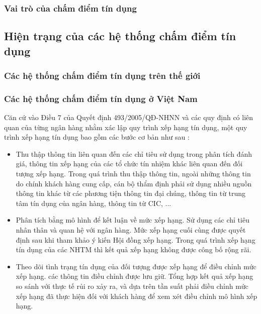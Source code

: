\subsubsection{Vai trò của chấm điểm tín dụng}

\subsection{Hiện trạng của các hệ thống chấm điểm tín dụng}
\subsubsection{Các hệ thống chấm điểm tín dụng trên thế giới}
\subsubsection{Các hệ thống chấm điểm tín dụng ở Việt Nam}
Căn cứ vào Điều 7 của Quyết định 493/2005/QĐ-NHNN và các quy định có liên quan của từng ngân hàng nhằm xác lập quy trình xếp hạng tín dụng, một quy trình 
xếp hạng tín dụng bao gồm các bước cơ bản như sau : 
\begin{itemize}
\item Thu thập thông tin liên quan đến các chỉ tiêu sử dụng trong phân tích đánh giá, thông tin xếp hạng của các tổ chức tín nhiệm khác liên quan đến đối tượng xếp hạng. Trong quá trình thu thập thông tin, ngoài những thông tin do chính khách hàng cung cấp, cán bộ thẩm định phải sử dụng nhiều nguồn thông tin khác từ các phương tiện thông tin đại chúng, thông tin từ trung tâm tín dụng của ngân hàng, thông tin từ CIC, ...
\item Phân tích bằng mô hình để kết luận về mức xếp hạng. Sử dụng các chỉ tiêu nhân thân và quan hệ với ngân hàng. Mức xếp hạng cuối cùng được quyết định sau khi tham khảo ý kiến Hội đồng xếp hạng. Trong quá trình xếp hạng tín dụng của các NHTM thì kết quả xếp hạng không được công bố rộng rãi.
\item Theo dõi tình trạng tín dụng của đối tượng được xếp hạng để điều chỉnh mức xếp hạng. các thông tin điều chỉnh được lưu giữ. Tổng hợp kết quả xếp hạng so sánh với thực tế rủi ro xảy ra, và dựa trên tần suất phải điều chỉnh mức xếp hạng đã thực hiện đối với khách hàng để xem xét điều chỉnh mô hình xếp hạng.
\end{itemize}